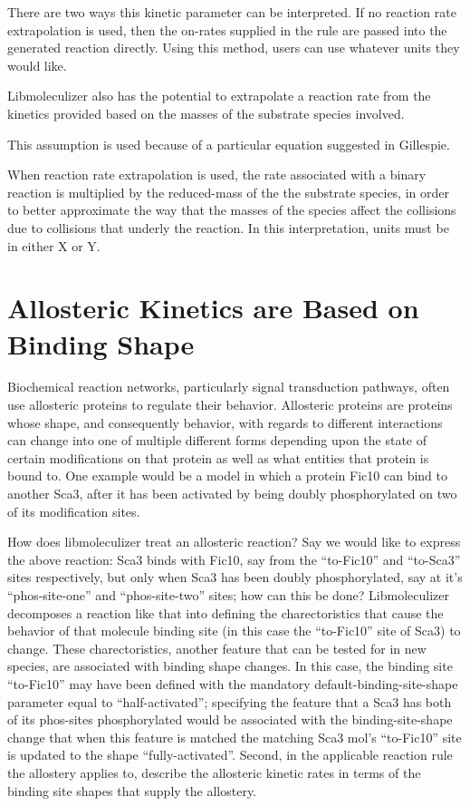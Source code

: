 There are two ways this kinetic parameter can be interpreted.  If no
reaction rate extrapolation is used, then the on-rates supplied in the
rule are passed into the generated reaction directly.  Using this
method, users can use whatever units they would like.

Libmoleculizer also has the potential to extrapolate a reaction rate
from the kinetics provided based on the masses of the substrate
species involved. 

This assumption is used because of a particular equation suggested in
Gillespie.

When reaction rate extrapolation is used, the rate associated with a
binary reaction is multiplied by the reduced-mass of the the substrate
species, in order to better approximate the way that the masses of the
species affect the collisions due to collisions that underly the
reaction.  In this interpretation, units must be in either X or Y.

\section{Allosteric Kinetics are Based on Binding Shape}
\label{sec:allosterickinetics}

Biochemical reaction networks, particularly signal transduction
pathways, often use allosteric proteins to regulate their
behavior. Allosteric proteins are proteins whose shape, and
consequently behavior, with regards to different interactions can
change into one of multiple different forms depending upon the state
of certain modifications on that protein as well as what entities that
protein is bound to.  One example would be a model in which a protein
Fic10 can bind to another Sca3, after it has been activated by being
doubly phosphorylated on two of its modification sites.  

How does libmoleculizer treat an allosteric reaction?  Say we would
like to express the above reaction: Sca3 binds with Fic10, say from
the ``to-Fic10'' and ``to-Sca3'' sites respectively, but only when
Sca3 has been doubly phosphorylated, say at it's ``phos-site-one'' and
``phos-site-two'' sites; how can this be done?  Libmoleculizer
decomposes a reaction like that into defining the charectoristics that
cause the behavior of that molecule binding site (in this case the
``to-Fic10'' site of Sca3) to change.  These charectoristics, another
feature that can be tested for in new species, are associated with
binding shape changes.  In this case, the binding site ``to-Fic10''
may have been defined with the mandatory default-binding-site-shape
parameter equal to ``half-activated''; specifying the feature that
a Sca3 has both of its phos-sites phosphorylated would be associated
with the binding-site-shape change that when this feature is matched
the matching Sca3 mol's ``to-Fic10'' site is updated to the shape
``fully-activated''.  Second, in the applicable reaction rule the
allostery applies to, describe the allosteric kinetic rates in terms
of the binding site shapes that supply the allostery. 

